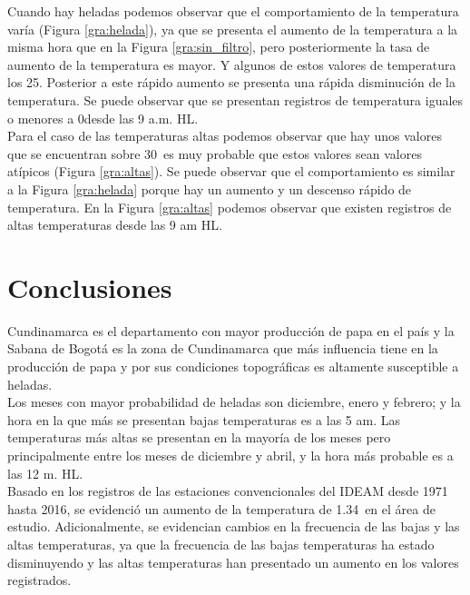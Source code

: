 Cuando hay heladas podemos observar que el comportamiento de la temperatura varía (Figura \ref{gra:helada}), ya que se presenta el aumento de la temperatura a la misma hora que en la Figura \ref{gra:sin_filtro}, pero posteriormente la tasa de aumento de la temperatura es mayor. Y algunos de estos valores de temperatura los 25\celsius. Posterior a este rápido aumento se presenta una rápida disminución de la temperatura. Se puede observar que se presentan registros de temperatura iguales o menores a 0\celsius desde las 9 a.m. HL.\\

Para el caso de las temperaturas altas podemos observar que hay unos valores que se encuentran sobre 30\celsius\ es muy probable que estos valores sean valores atípicos (Figura \ref{gra:altas}). Se puede observar que el comportamiento es similar a la Figura \ref{gra:helada} porque hay un aumento y un descenso rápido de temperatura. En la Figura \ref{gra:altas} podemos observar que existen registros de altas temperaturas desde las 9 am HL.\\




\section{Conclusiones}

Cundinamarca es el departamento con mayor producción de papa en el país y la Sabana de Bogotá es la zona de Cundinamarca que más influencia tiene en la producción de papa y por sus condiciones topográficas es altamente susceptible a heladas.\\

Los meses con mayor probabilidad de heladas son diciembre, enero y febrero; y la hora en la que más se presentan bajas temperaturas es a las 5 am. Las temperaturas más altas se presentan en la mayoría de los meses pero principalmente entre los meses de diciembre y abril, y la hora más probable es a las 12 m. HL.\\

Basado en los registros de las estaciones convencionales del IDEAM desde 1971 hasta 2016, se evidenció un aumento de la temperatura de 1.34\celc \ en el área de estudio. Adicionalmente, se evidencian cambios en la frecuencia de las bajas y las altas temperaturas, ya que la frecuencia de las bajas temperaturas ha estado disminuyendo y las altas temperaturas han presentado un aumento en los valores registrados.\\


